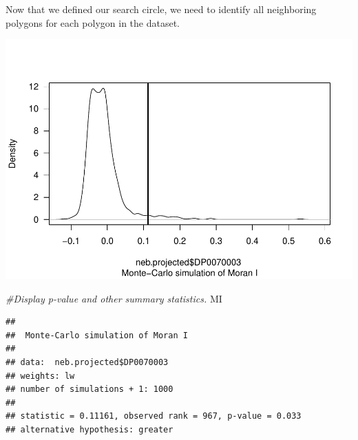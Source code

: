 \documentclass[]{article}
\newenvironment{Shaded}{\begin{snugshade}}{\end{snugshade}}
\newcommand{\AttributeTok}[1]{\textcolor[rgb]{0.77,0.63,0.00}{#1}}
\newcommand{\CommentTok}[1]{\textcolor[rgb]{0.56,0.35,0.01}{\textit{#1}}}
\newcommand{\DecValTok}[1]{\textcolor[rgb]{0.00,0.00,0.81}{#1}}
\newcommand{\FunctionTok}[1]{\textcolor[rgb]{0.00,0.00,0.00}{#1}}
\newcommand{\NormalTok}[1]{#1}
\newcommand{\OtherTok}[1]{\textcolor[rgb]{0.56,0.35,0.01}{#1}}
\newcommand{\SpecialCharTok}[1]{\textcolor[rgb]{0.00,0.00,0.00}{#1}}
\newcommand{\StringTok}[1]{\textcolor[rgb]{0.31,0.60,0.02}{#1}}
\begin{document}
Now that we defined our search circle, we need to identify all
neighboring polygons for each polygon in the dataset.

\begin{Shaded}
\end{Shaded}

\includegraphics{lab03_files/figure-latex/calcnb-1.pdf}

\begin{Shaded}
\begin{Highlighting}[]
\CommentTok{\#Display p{-}value and other summary statistics.}
\NormalTok{MI}
\end{Highlighting}
\end{Shaded}

\begin{verbatim}
## 
##  Monte-Carlo simulation of Moran I
## 
## data:  neb.projected$DP0070003 
## weights: lw  
## number of simulations + 1: 1000 
## 
## statistic = 0.11161, observed rank = 967, p-value = 0.033
## alternative hypothesis: greater
\end{verbatim}
\end{document}
